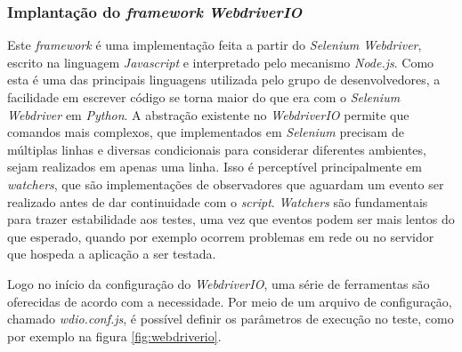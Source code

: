 \hypertarget{implementacao-do-framework-webdriverio}{%
\subsubsection{\texorpdfstring{Implantação do \emph{framework} \emph{WebdriverIO}}{Implementação do framework WebdriverIO}}\label{implementacao-do-framework-webdriverio}}

Este \emph{framework} é uma implementação feita a partir do \emph{Selenium Webdriver}, escrito na linguagem \emph{Javascript} e interpretado pelo mecanismo \emph{Node.js}. Como esta é uma das principais linguagens utilizada pelo grupo de desenvolvedores, a facilidade em escrever código se torna maior do que era com o \emph{Selenium Webdriver} em \emph{Python}. A abstração existente no \emph{WebdriverIO} permite que comandos mais complexos, que implementados em \emph{Selenium} precisam de múltiplas linhas e diversas condicionais para considerar diferentes ambientes, sejam realizados em apenas uma linha. Isso é perceptível principalmente em \emph{watchers}, que são implementações de observadores que aguardam um evento ser realizado antes de dar continuidade com o \emph{script}. \emph{Watchers} são fundamentais para trazer estabilidade aos testes, uma vez que eventos podem ser mais lentos do que esperado, quando por exemplo ocorrem problemas em rede ou no servidor que hospeda a aplicação a ser testada.

Logo no início da configuração do \emph{WebdriverIO}, uma série de ferramentas são oferecidas de acordo com a necessidade. Por meio de um arquivo de configuração, chamado \emph{wdio.conf.js}, é possível definir os parâmetros de execução no teste, como por exemplo na figura \ref{fig:webdriverio}.

